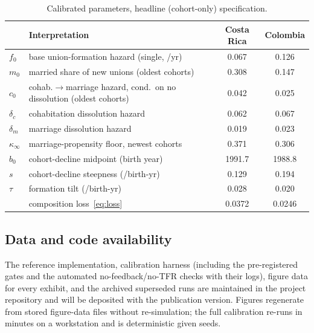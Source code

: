 \begin{table}[h]
\centering
\caption{Calibrated parameters, headline (cohort-only) specification.}
\label{tab:params}
\small
\begin{tabular}{llcc}
\toprule
& Interpretation & Costa Rica & Colombia \\
\midrule
$f_0$ & base union-formation hazard (single, /yr) & 0.067 & 0.126 \\
$m_0$ & married share of new unions (oldest cohorts) & 0.308 & 0.147 \\
$c_0$ & cohab.$\to$marriage hazard, cond.\ on no dissolution (oldest cohorts) & 0.042 & 0.025 \\
$\delta_c$ & cohabitation dissolution hazard & 0.062 & 0.067 \\
$\delta_m$ & marriage dissolution hazard & 0.019 & 0.023 \\
\midrule
$\kappa_\infty$ & marriage-propensity floor, newest cohorts & 0.371 & 0.306 \\
$b_0$ & cohort-decline midpoint (birth year) & 1991.7 & 1988.8 \\
$s$ & cohort-decline steepness (/birth-yr) & 0.129 & 0.194 \\
$\tau$ & formation tilt (/birth-yr) & 0.028 & 0.020 \\
\midrule
& composition loss~\eqref{eq:loss} & 0.0372 & 0.0246 \\
\bottomrule
\end{tabular}
\end{table}

\subsection{Data and code availability}

The reference implementation, calibration harness (including the
pre-registered gates and the automated no-feedback/no-TFR checks with their
logs), figure data for every exhibit, and the archived superseded runs are
maintained in the project repository and will be deposited with the
publication version. Figures regenerate from stored figure-data files without
re-simulation; the full calibration re-runs in minutes on a workstation and is
deterministic given seeds.
